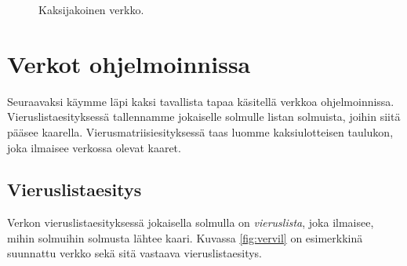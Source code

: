 \begin{figure}
\center
\begin{center}
\end{center}
\caption{Kaksijakoinen verkko.}
\label{fig:verkak}
\end{figure}

\section{Verkot ohjelmoinnissa}

Seuraavaksi käymme läpi kaksi tavallista tapaa
käsitellä verkkoa ohjelmoinnissa.
Vieruslistaesityksessä tallennamme jokaiselle
solmulle listan solmuista, joihin siitä pääsee kaarella.
Vierusmatriisiesityksessä taas luomme kaksiulotteisen
taulukon, joka ilmaisee verkossa olevat kaaret.

\subsection{Vieruslistaesitys}

Verkon vieruslistaesityksessä jokaisella solmulla on
\emph{vieruslista}, joka ilmaisee, mihin solmuihin
solmusta lähtee kaari.
Kuvassa \ref{fig:vervil} on esimerkkinä suunnattu verkko
sekä sitä vastaava vieruslistaesitys.

